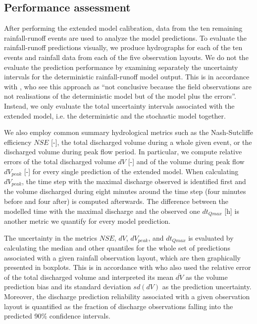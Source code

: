 \documentclass{ctuthesis}\usepackage[]{graphicx}\usepackage[]{color}
\begin{document}
\subsection{Performance assessment}

After performing the extended model calibration, data from the ten remaining rainfall-runoff events are used to analyze the model predictions. To evaluate the rainfall-runoff predictions visually, we produce hydrographs for each of the ten events and rainfall data from each of the five observation layouts. We do not the evaluate the prediction performance  by examining separately the uncertainty intervals for the deterministic rainfall-runoff model output. This is in accordance with \cite{giudice2013improving}, who see this approach as \enquote{not conclusive because the field observations are not realisations of the deterministic model but of the model plus the errors}. Instead, we only evaluate the total uncertainty intervals associated with the extended model, i.e. the deterministic and the stochastic model together. 

We also employ common summary hydrological metrics such as the Nash-Sutcliffe efficiency $N\!S\!E$ [-], the total discharged volume during a whole given event, or the discharged volume during peak flow period.  In particular, we compute relative errors of the total discharged volume  $dV$ [-] and of the volume during peak flow $dV_{peak}$ [-] for every single prediction of the extended model. When calculating $dV_{peak}$, the time step with the maximal discharge observed is identified first and the volume discharged during eight minutes around the time step (four minutes before and four after) is computed afterwards. The difference between the modelled time with the maximal discharge and the observed one $dt_{Qmax}$ [h] is another metric we quantify for every model prediction. 

The uncertainty in the metrics $N\!S\!E$, $dV$, $dV_{peak}$, and $dt_{Qmax}$ is evaluated by calculating the median and other quantiles for the whole set of predictions associated with a given rainfall observation layout, which are then graphically presented in boxplots.  This is in accordance with \cite{fencl2013assessing} who also used the relative error of the total discharged volume and interpreted its mean $\overline{dV}$ as the volume prediction bias and its standard deviation $sd(dV)$ as the prediction uncertainty. Moreover, the discharge prediction reliability associated with a given observation layout is quantified as the fraction of discharge observations falling into the predicted 90\% confidence intervals.
\end{document}
